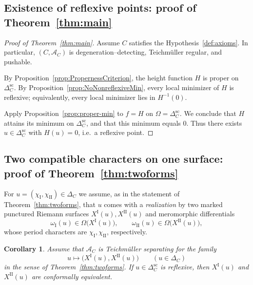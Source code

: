 \documentclass[a4paper,12pt]{amsart}
\theoremstyle{plain}
\newtheorem{corollary}[theorem]{Corollary}
\theoremstyle{definition}
\begin{document}
\subsection{Existence of reflexive points: proof of Theorem~\ref{thm:main}}\label{sec:main_theorem}

\begin{proof}[Proof of Theorem~\ref{thm:main}]
Assume $C$ satisfies the Hypothesis~\ref{def:axioms}. In particular, $(C,\mathcal A_C)$ is
degeneration--detecting, Teichm\"uller regular, and pushable.

By Proposition~\ref{prop:PropernessCriterion}, the height function $H$ is proper on $\Delta_C^{\mathrm{sc}}$.
By Proposition~\ref{prop:NoNonreflexiveMin}, every local minimizer of $H$ is reflexive; equivalently, every local minimizer
lies in $H^{-1}(0)$.

Apply Proposition~\ref{prop:proper-min} to $f=H$ on $\Omega=\Delta_C^{\mathrm{sc}}$.
We conclude that $H$ attains its minimum on $\Delta_C^{\mathrm{sc}}$, and that this minimum equals $0$.
Thus there exists $u\in\Delta_C^{\mathrm{sc}}$ with $H(u)=0$, i.e.\ a reflexive point.
\end{proof}

\subsection{Two compatible characters on one surface: proof of Theorem~\ref{thm:twoforms}}\label{subsec:twoforms}

For $u=(\chi_{\mathrm{I}},\chi_{\mathrm{II}})\in\Delta_C$ we assume, as in the statement of
Theorem~\ref{thm:twoforms}, that $u$ comes with a \emph{realization} by two marked punctured Riemann surfaces
$X^{\mathrm{I}}(u),X^{\mathrm{II}}(u)$ and meromorphic differentials
\[
\omega_{\mathrm{I}}(u)\in\Omega\bigl(X^{\mathrm{I}}(u)\bigr),\qquad
\omega_{\mathrm{II}}(u)\in\Omega\bigl(X^{\mathrm{II}}(u)\bigr),
\]
whose period characters are $\chi_{\mathrm{I}},\chi_{\mathrm{II}}$, respectively.

\begin{corollary}\label{cor:twoforms}
Assume that $\mathcal A_C$ is Teichm\"uller separating for the family
\[
u\longmapsto \bigl(X^{\mathrm{I}}(u),X^{\mathrm{II}}(u)\bigr)
\qquad (u\in\Delta_C)
\]
in the sense of Theorem~\ref{thm:twoforms}.
If $u\in\Delta_C^{\mathrm{sc}}$ is reflexive, then $X^{\mathrm{I}}(u)$ and $X^{\mathrm{II}}(u)$ are conformally equivalent.
\end{corollary}
\end{document}
